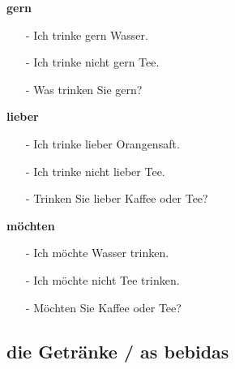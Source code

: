             \begin{multicols}{3}
                \textbf{gern}
                \begin{itemize}[before=\renewcommand{\baselinestretch}{1},topsep=0pt,itemsep=4pt,parsep=0pt]
                    \item[-] \textsb{[+]} Ich trinke gern Wasser.
                    \item[-] \textsb{[-]} Ich trinke nicht gern Tee.
                    \item[-] \textsb{[?]} Was trinken Sie gern? 
                \end{itemize}
            \vfill\null
            \columnbreak
                \textbf{lieber}
                \begin{itemize}[before=\renewcommand{\baselinestretch}{1},topsep=0pt,itemsep=4pt,parsep=0pt]
                    \item[-] \textsb{[+]} Ich trinke lieber Orangensaft.
                    \item[-] \textsb{[-]} Ich trinke nicht lieber Tee.
                    \item[-] \textsb{[?]} Trinken Sie lieber Kaffee oder Tee? 
                \end{itemize}
            \vfill\null
            \columnbreak
                \textbf{möchten}
                \begin{itemize}[before=\renewcommand{\baselinestretch}{1},topsep=0pt,itemsep=4pt,parsep=0pt]
                    \item[-] \textsb{[+]} Ich möchte Wasser trinken.
                    \item[-] \textsb{[-]} Ich möchte nicht Tee trinken.
                    \item[-] \textsb{[?]} Möchten Sie Kaffee oder Tee? 
                \end{itemize}
            \vfill\null
            \end{multicols}

        \subsection{die Getränke / as bebidas}\label{subsection:deutsch:im_cafe:die_getranke}

